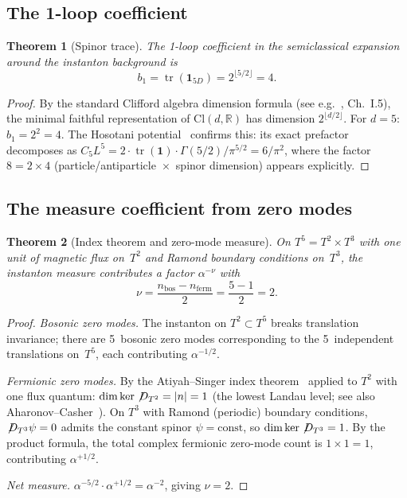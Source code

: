 \documentclass[11pt,a4paper]{article}
\newtheorem{theorem}{Theorem}
\theoremstyle{definition}
\theoremstyle{remark}
\begin{document}
\subsection{The 1-loop coefficient}

\begin{theorem}[Spinor trace]\label{thm:spinor}
The 1-loop coefficient in the semiclassical expansion around the
instanton background is
\begin{equation}
  b_1 = \operatorname{tr}(\mathbf{1}_{5D})
      = 2^{\lfloor 5/2\rfloor} = 4.
\end{equation}
\end{theorem}

\begin{proof}
By the standard Clifford algebra dimension formula
(see e.g.~\cite{LawsonMichelsohn1989}, Ch.~I.5),
the minimal faithful representation of
$\mathrm{Cl}(d,\mathbb{R})$ has dimension $2^{\lfloor d/2\rfloor}$.
For $d=5$: $b_1=2^2=4$.
The Hosotani potential~\cite{Hosotani1983,Toms1983}
confirms this: its exact prefactor decomposes as
$C_5 L^5 = 2\cdot\operatorname{tr}(\mathbf{1})\cdot\Gamma(5/2)/\pi^{5/2}
= 6/\pi^2$,
where the factor $8=2\times 4$ (particle/antiparticle~$\times$~spinor
dimension) appears explicitly.
\end{proof}

\subsection{The measure coefficient from zero modes}

\begin{theorem}[Index theorem and zero-mode measure]\label{thm:index}
On $T^5=T^2\times T^3$ with one unit of magnetic flux on~$T^2$ and
Ramond boundary conditions on~$T^3$, the instanton measure contributes a
factor $\alpha^{-\nu}$ with
\begin{equation}
  \nu = \frac{n_{\mathrm{bos}}-n_{\mathrm{ferm}}}{2}
      = \frac{5-1}{2} = 2.
\end{equation}
\end{theorem}

\begin{proof}
\emph{Bosonic zero modes.}  The instanton on $T^2\subset T^5$ breaks
translation invariance; there are 5~bosonic zero modes corresponding to
the 5~independent translations on~$T^5$, each contributing $\alpha^{-1/2}$.

\emph{Fermionic zero modes.}  By the Atiyah--Singer index
theorem~\cite{AtiyahSinger1968} applied to
$T^2$ with one flux quantum: $\dim\ker\not\!D_{T^2}=|n|=1$ (the
lowest Landau level; see also Aharonov--Casher~\cite{AharonovCasher1979}).
On $T^3$ with Ramond
(periodic) boundary conditions, $\not\!D_{T^3}\psi=0$ admits the
constant spinor $\psi=\mathrm{const}$, so
$\dim\ker\not\!D_{T^3}=1$.  By the product formula, the total
complex fermionic zero-mode count is $1\times 1=1$, contributing
$\alpha^{+1/2}$.

\emph{Net measure.}  $\alpha^{-5/2}\cdot\alpha^{+1/2}=\alpha^{-2}$,
giving $\nu=2$.
\end{proof}
\end{document}
